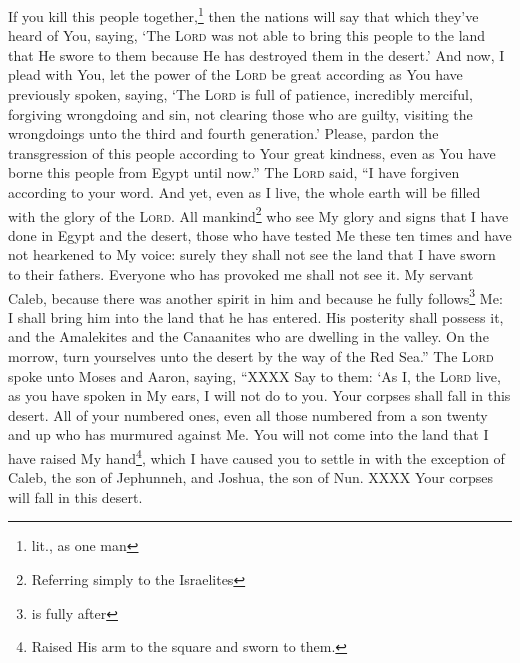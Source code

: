 \begin{enumerate}[align=center]
     If you kill this people together,\footnote{lit., as one man} then the nations will say that which they've heard of You, saying,%
     `The \textsc{Lord} was not able to bring this people to the land that He swore to them because He has destroyed them in the desert.'%
     And now, I plead with You, let the power of the \textsc{Lord} be great according as You have previously spoken, saying,%
     `The \textsc{Lord} is full of patience, incredibly merciful, forgiving wrongdoing and sin, not clearing those who are guilty, visiting the wrongdoings unto the third and fourth generation.'%
     Please, pardon the transgression of this people according to Your great kindness, even as You have borne this people from Egypt until now.''%
     The \textsc{Lord} said, ``I have forgiven according to your word.%
     And yet, even as I live, the whole earth will be filled with the glory of the \textsc{Lord}.%
     All mankind\footnote{Referring simply to the Israelites} who see My glory and signs that I have done in Egypt and the desert, those who have tested Me these ten times and have not hearkened to My voice:%
     surely they shall not see the land that I have sworn to their fathers. Everyone who has provoked me shall not see it.%
     My servant Caleb, because there was another spirit in him and because he fully follows\footnote{is fully after} Me: I shall bring him into the land that he has entered. His posterity shall possess it,%
     and the Amalekites and the Canaanites who are dwelling in the valley. On the morrow, turn yourselves unto the desert by the way of the Red Sea.''%
     The \textsc{Lord} spoke unto Moses and Aaron, saying,%
     ``XXXX%
     Say to them: `As I, the \textsc{Lord} live, as you have spoken in My ears, I will not do to you.%
     Your corpses shall fall in this desert. All of your numbered ones, even all those numbered from a son twenty and up who has murmured against Me.%
     You will not come into the land that I have raised My hand\footnote{Raised His arm to the square and sworn to them.}, which I have caused you to settle in with the exception of Caleb, the son of Jephunneh, and Joshua, the son of Nun.%
     XXXX%
     Your corpses will fall in this desert.%

\end{enumerate}
